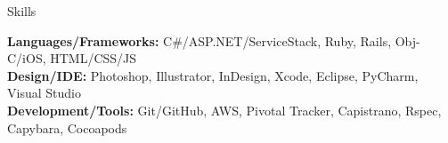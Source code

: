 \documentclass{resume} %
\begin{document}

\begin{rSection}{Skills}

\textbf{Languages/Frameworks:} C\#/ASP.NET/ServiceStack, Ruby, Rails, Obj-C/iOS, HTML/CSS/JS \\
\textbf{Design/IDE:} Photoshop, Illustrator, InDesign, Xcode, Eclipse, PyCharm, Visual Studio  \\
\textbf{Development/Tools:} Git/GitHub, AWS, Pivotal Tracker, Capistrano, Rspec, Capybara, Cocoapods \\

\end{rSection}

\end{document}
